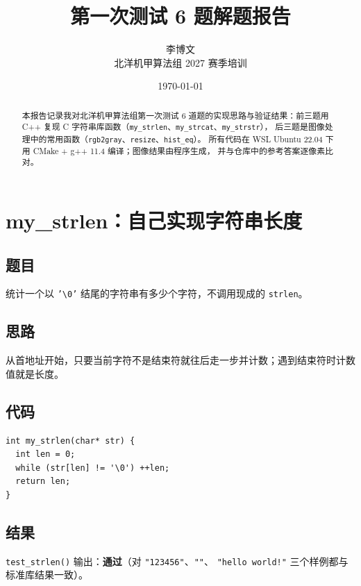 \documentclass[11pt,a4paper]{ctexart}
\title{第一次测试 6 题解题报告}
\author{李博文 \\ \small 北洋机甲算法组 2027 赛季培训}
\date{\today}
\begin{document}
\setcounter{tocdepth}{1}

\maketitle

\begin{abstract}
本报告记录我对北洋机甲算法组第一次测试 6 道题的实现思路与验证结果：前三题用 C++ 复现
C 字符串库函数（\texttt{my\_strlen}、\texttt{my\_strcat}、\texttt{my\_strstr}），
后三题是图像处理中的常用函数（\texttt{rgb2gray}、\texttt{resize}、\texttt{hist\_eq}）。
所有代码在 WSL Ubuntu 22.04 下用 CMake + g++ 11.4 编译；图像结果由程序生成，
并与仓库中的参考答案逐像素比对。
\end{abstract}

\tableofcontents
\newpage

\section{my\_strlen：自己实现字符串长度}
\subsection{题目}
统计一个以 \texttt{'\textbackslash 0'} 结尾的字符串有多少个字符，不调用现成的
\texttt{strlen}。

\subsection{思路}
从首地址开始，只要当前字符不是结束符就往后走一步并计数；遇到结束符时计数值就是长度。

\subsection{代码}
\begin{lstlisting}
int my_strlen(char* str) {
  int len = 0;
  while (str[len] != '\0') ++len;
  return len;
}
\end{lstlisting}

\subsection{结果}
\texttt{test\_strlen()} 输出：\textbf{通过}（对 \texttt{"123456"}、\texttt{""}、
\texttt{"hello world!"} 三个样例都与标准库结果一致）。
\end{document}
